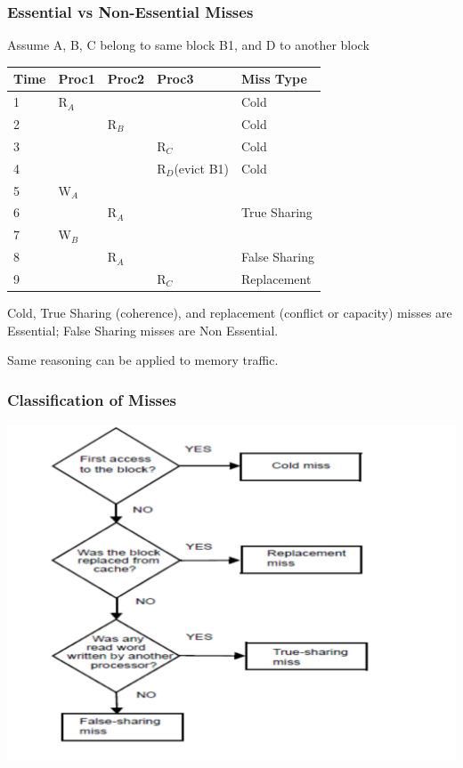 \documentclass{beamer}
\renewcommand{\emph}[1]{\textcolor{structure}{#1}}
\begin{document}
\begin{frame}[fragile,t]
\frametitle{Essential vs Non-Essential Misses}

Assume A, B, C belong to same block B1, and D to another block
\begin{tabular}{lllll}
\hline
Time    & Proc1 & Proc2 & Proc3 & Miss Type \\\hline
1       & R$_A$ &       &       & Cold      \\
2       &       & R$_B$ &       & Cold      \\
3       &       &       & R$_C$ & Cold      \\
4       &       &       & R$_D$(evict B1) & Cold      \\
5       & W$_A$ &       &       &           \\
6       &       & R$_A$ &       & True Sharing      \\
7       & W$_B$ &       &       &           \\
8       &       & R$_A$ &       & False Sharing     \\
9       &       &       & R$_C$ & Replacement \\\hline
\end{tabular}
\bigskip

Cold, True Sharing (coherence), and replacement (conflict or capacity)
misses are \emph{Essential}; False Sharing misses are \alert{Non Essential}.\bigskip

Same reasoning can be applied to memory traffic.
\end{frame}

\begin{frame}[fragile,t]
\frametitle{Classification of Misses}
\includegraphics[width=59ex]{FigsInfCoherence/MissClassif}
\end{frame}
\end{document}
